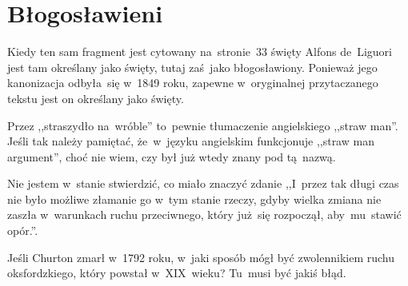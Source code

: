 \documentclass[a4paper,11pt]{article}
\begin{document}
\vspace{\spaceTwo}





\newpage
\section{Błogosławieni}

\vspace{\spaceTwo}







\start {} Kiedy ten sam fragment jest cytowany
na~stronie~33 święty Alfons de~Liguori jest tam określany jako święty,
tutaj zaś~jako błogosławiony. Ponieważ jego kanonizacja odbyła~się
w~1849 roku, zapewne w~oryginalnej przytaczanego tekstu jest on
określany jako święty.

\vspace{\spaceFour}


\start {} Przez ,,straszydło na~wróble'' to~pewnie
tłumaczenie angielskiego ,,straw man''. Jeśli tak należy pamiętać,
że~w~języku angielskim funkcjonuje ,,straw man argument'', choć nie
wiem, czy był już wtedy znany pod tą~nazwą.

\vspace{\spaceFour}


\start {} Nie jestem w~stanie stwierdzić, co miało znaczyć
zdanie ,,I~przez tak długi czas nie było możliwe złamanie go w~tym
stanie rzeczy, gdyby wielka zmiana nie zaszła w~warunkach ruchu
przeciwnego, który już~się rozpoczął, aby~mu~stawić opór.''.

\vspace{\spaceFour}


\start {} Jeśli Churton zmarł w~1792 roku, w~jaki sposób
mógł być zwolennikiem ruchu oksfordzkiego, który powstał w~XIX~wieku?
Tu~musi być jakiś błąd.

\vspace{\spaceFour}
\end{document}
